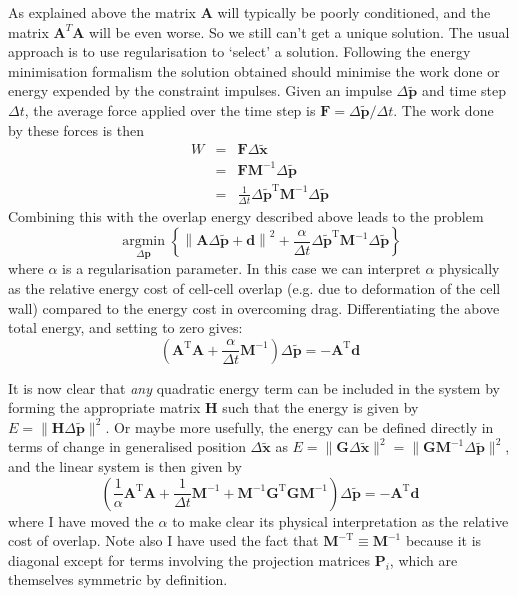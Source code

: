 \documentclass{report}
\renewcommand{\vec}[1]{\mathbf{#1}}
\newcommand{\mat}{\mathbf}
\newcommand{\invmat}[1]{\mat{#1}^{-1}}
\newcommand{\deltap}{\Delta \vec{p}}
\newcommand{\Minv}{\mat{M}^{-1}}
\begin{document}
As explained above the matrix $\mat{A}$ will typically be poorly conditioned,
and the matrix $\mat{A}^T\mat{A}$ will be even worse. So we still can't get a
unique solution. The usual approach is to use regularisation to `select' a
solution.
Following the energy minimisation formalism the solution obtained should
minimise the work done or energy expended by the constraint impulses.
Given an impulse $\Delta \tilde{\vec{p}}$ and time step $\Delta t$, the average
force applied over the time step is $\vec{F}=\Delta \tilde{\vec{p}}/\Delta t$. The work
done by these forces is then
\begin{eqnarray*}
W &=& \vec{F}\Delta \tilde{\vec{x}} \\
&=& \vec{F} \invmat{M} \Delta \tilde{\vec{p}} \\
&=& \frac{1}{\Delta t} \Delta \tilde{\vec{p}}^\textrm{T} \invmat{M}\Delta \tilde{\vec{p}}
\end{eqnarray*}
Combining this
with the overlap energy described above leads to the problem
\[\underset{\deltap}{\operatorname{argmin}}
\left\{
\left\|\mat{A}\Delta\tilde{\vec{p}} + \vec{d}\right\|^2 + \frac{\alpha}{\Delta
t} \Delta \tilde{\vec{p}}^\textrm{T}\invmat{M}\Delta \tilde{\vec{p}} \right\} \]
where $\alpha$ is a regularisation parameter. In this case we can interpret
$\alpha$ physically as the relative energy cost of cell-cell overlap (e.g. due
to deformation of the cell wall) compared to the energy cost in overcoming drag.
Differentiating the above total energy, and setting to zero gives:
\begin{equation}
\left(\mat{A}^{\textrm{T}}\mat{A} + \frac{\alpha}{\Delta t}\Minv\right)\Delta \tilde{\vec{p}} = -\mat{A}^{\textrm{T}}\vec{d}
\label{eqn:finalsystem}
\end{equation}

It is now clear that \textit{any} quadratic energy term can be included in the
system by forming the appropriate matrix $\mat{H}$ such that the energy is given
by $E = \|\mat{H}\Delta \tilde{\vec{p}} \|^2$. Or maybe more usefully, the
energy can be defined directly in terms of change in generalised position
$\Delta \tilde{\vec{x}}$ as $E = \|\mat{G}\Delta \tilde{\vec{x}} \|^2 =
\|\mat{G}\invmat{M}\Delta \tilde{\vec{p}} \|^2$, and the linear system is then
given by
\begin{equation}
\left(\frac{1}{\alpha}\mat{A}^{\textrm{T}}\mat{A} + \frac{1}{\Delta t}\Minv +
\invmat{M}\mat{G}^\textrm{T} \mat{G}\invmat{M} \right) \Delta \tilde{\vec{p}} = -\mat{A}^{\textrm{T}}\vec{d}
\label{eqn:finalsystem}
\end{equation}
where I have moved the $\alpha$ to make clear its physical interpretation as the
relative cost of overlap. Note also I have used the fact that
$\mat{M}^{-\textrm{T}} \equiv \invmat{M}$ because it is diagonal except for terms
involving the projection matrices $\mat{P}_i$, which are themselves symmetric by
definition.
\end{document}
